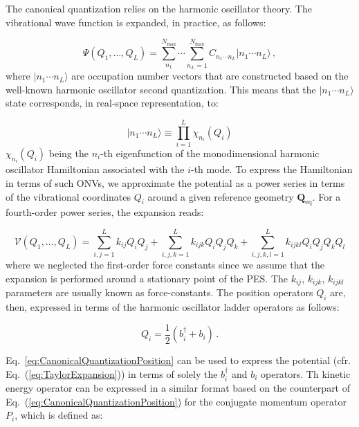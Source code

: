 \documentclass[bibliography=totoc,12pt,a4paper]{scrartcl}
\begin{document}
The canonical quantization relies on the harmonic oscillator theory.\cite{Hirata2014_NormalOrdered}
The vibrational wave function is expanded, in practice, as follows:

\begin{equation}
  \Psi(Q_1, \ldots, Q_L) = \sum_{n_1}^{N_\text{max}} \cdots \sum_{n_L=1}^{N_\text{max}}
	C_{n_1 \cdots n_L} | n_1 \cdots n_L \rangle \, ,
  \label{eq:CanonicalQuantizationCI}
\end{equation}
%
where $| n_1 \cdots n_L \rangle$ are occupation number vectors that are constructed based on the well-known harmonic oscillator second quantization.
This means that the $| n_1 \cdots n_L \rangle$ state corresponds, in real-space representation, to:

\begin{equation}
  | n_1 \cdots n_L \rangle \equiv \prod_{i=1}^L \chi_{n_i}(Q_i)
  \label{eq:HarmonicOscillatorBasis}
\end{equation}
%
$\chi_{n_i}(Q_i)$ being the $n_i$-th eigenfunction of the monodimensional harmonic oscillator Hamiltonian associated with the $i$-th mode.
To express the Hamiltonian in terms of such ONVs, we approximate the potential as a power series in terms of the vibrational coordinates $Q_i$ around a given reference geometry $\bm{Q}_\text{eq}$.
For a fourth-order power series, the expansion reads:

\begin{equation}
  \mathcal{V}(Q_1, \ldots, Q_L) 
	= \sum_{i,j=1}^L k_{ij} Q_i Q_j + \sum_{i,j,k=1}^L k_{ijk} Q_i Q_j Q_k
    + \sum_{i,j,k,l=1}^L k_{ijkl} Q_i Q_j Q_k Q_l
  \label{eq:TaylorExpansion}
\end{equation}
%
where we neglected the first-order force constants since we assume that the expansion is performed around a stationary point of the PES.
The $k_{ij}$, $k_{ijk}$, $k_{ijkl}$ parameters are usually known as force-constants.
The position operators $Q_i$ are, then, expressed in terms of the harmonic oscillator ladder operators as follows:

\begin{equation}
  Q_i = \frac{1}{2} \left( b_i^\dagger + b_i \right) \, .
  \label{eq:CanonicalQuantizationPosition}
\end{equation}

Eq.~\ref{eq:CanonicalQuantizationPosition} can be used to express the potential (cfr. Eq.~(\ref{eq:TaylorExpansion})) in terms of solely the $b_i^\dagger$ and $b_i$ operators.
Th kinetic energy operator can be expressed in a similar format based on the counterpart of Eq.~(\ref{eq:CanonicalQuantizationPosition}) for the conjugate momentum operator $P_i$, which is defined as:
\end{document}
